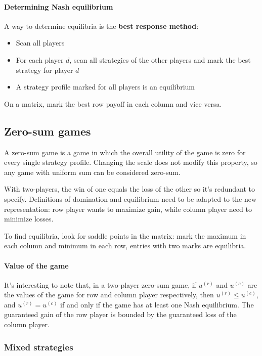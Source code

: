 \paragraph{Determining Nash equilibrium} A way to determine equilibria is the \textbf{best response method}: 
\begin{itemize}
	\item Scan all players
	
	\item For each player $d$, scan all strategies of the other players and mark the best strategy for player $d$
	
	\item A strategy profile marked for all players is an equilibrium
\end{itemize}

On a matrix, mark the best row payoff in each column and vice versa. 

\subsection{Zero-sum games}

A zero-sum game is a game in which the overall utility of the game is zero for every single strategy profile. Changing the scale does not modify this property, so any game with uniform sum can be considered zero-sum. 

With two-players, the win of one equals the loss of the other so it's redundant to specify. Definitions of domination and equilibrium need to be adapted to the new representation: row player wants to maximize gain, while column player need to minimize losses. 

To find equilibria, look for saddle points in the matrix: mark the maximum in each column and minimum in each row, entries with two marks are equilibria.

\paragraph{Value of the game} It's interesting to note that, in a two-player zero-sum game, if $u^{(r)}$ and $u^{(c)}$ are the values of the game for row and column player respectively, then $u^{(r)} \leq u^{(c)}$, and $u^{(r)} = u^{(c)}$ if and only if the game has at least one Nash equilibrium. The guaranteed gain of the row player is bounded by the guaranteed loss of the column player.

\subsubsection{Mixed strategies}

